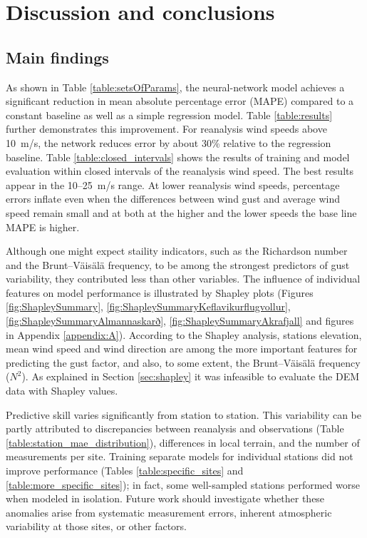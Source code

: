 \chapter{Discussion and conclusions}
\label{Chapter5}

\section{Main findings}
As shown in Table \ref{table:setsOfParams}, the neural-network model achieves a significant reduction in mean absolute percentage error (MAPE) compared to a constant baseline as well as a simple regression model. Table \ref{table:results} further demonstrates this improvement. For reanalysis wind speeds above 10~m/s, the network reduces error by about 30\% relative to the regression baseline. Table \ref{table:closed_intervals} shows the results of training and model evaluation within closed intervals of the reanalysis wind speed. The best results appear in the 10--25~m/s range. At lower reanalysis wind speeds, percentage errors inflate even when the differences between wind gust and average wind speed remain small and at both at the higher and the lower speeds the base line MAPE is higher.

Although one might expect staility indicators, such as the Richardson number and the Brunt--Väisälä frequency, to be among the strongest predictors of gust variability, they contributed less than other variables. The influence of individual features on model performance is illustrated by Shapley plots (Figures \ref{fig:ShapleySummary}, \ref{fig:ShapleySummaryKeflavikurflugvollur}, \ref{fig:ShapleySummaryAlmannaskarð}, \ref{fig:ShapleySummaryAkrafjall} and figures in Appendix \ref{appendix:A}). According to the Shapley analysis, stations elevation, mean wind speed and wind direction are among the more important features for predicting the gust factor, and also, to some extent, the Brunt--Väisälä frequency ($N^2$). As explained in Section \ref{sec:shapley} it was infeasible to evaluate the DEM data with Shapley values.

Predictive skill varies significantly from station to station. This variability can be partly attributed to discrepancies between reanalysis and observations (Table \ref{table:station_mae_distribution}), differences in local terrain, and the number of measurements per site. Training separate models for individual stations did not improve performance (Tables \ref{table:specific_sites} and \ref{table:more_specific_sites}); in fact, some well-sampled stations performed worse when modeled in isolation. Future work should investigate whether these anomalies arise from systematic measurement errors, inherent atmospheric variability at those sites, or other factors.

